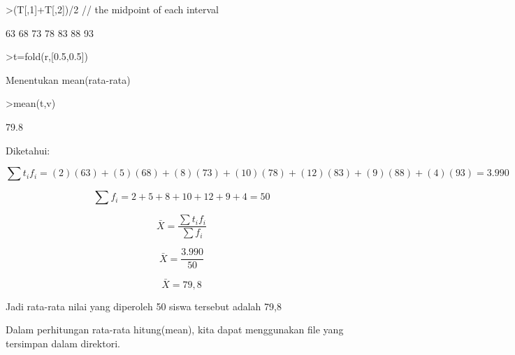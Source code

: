 \documentclass[a4paper,10pt]{article}
\begin{document}
\begin{eulernotebook}
\begin{eulerprompt}
>(T[,1]+T[,2])/2 // the midpoint of each interval
\end{eulerprompt}
\begin{euleroutput}
             63 
             68 
             73 
             78 
             83 
             88 
             93 
\end{euleroutput}
\begin{eulerprompt}
>t=fold(r,[0.5,0.5])
\end{eulerprompt}
\begin{euleroutput}
  [63,  68,  73,  78,  83,  88,  93]
\end{euleroutput}
\begin{eulercomment}
Menentukan mean(rata-rata)
\end{eulercomment}
\begin{eulerprompt}
>mean(t,v)
\end{eulerprompt}
\begin{euleroutput}
  79.8
\end{euleroutput}
\begin{eulercomment}
Diketahui:\\
\end{eulercomment}
\begin{eulerformula}
\[
\sum t_i f_i=(2)(63)+(5)(68)+(8)(73)+(10)(78)+(12)(83)+(9)(88)+(4)(93)=3.990
\]
\end{eulerformula}
\begin{eulerformula}
\[
\sum f_i=2+5+8+10+12+9+4=50
\]
\end{eulerformula}
\begin{eulerformula}
\[
\bar{X} = \frac{\sum t_i f_i}{\sum f_i}
\]
\end{eulerformula}
\begin{eulerformula}
\[
\bar{X} = \frac{3.990}{50}
\]
\end{eulerformula}
\begin{eulerformula}
\[
\bar{X} = 79,8
\]
\end{eulerformula}
\begin{eulercomment}
Jadi rata-rata nilai yang diperoleh 50 siswa tersebut adalah 79,8

\end{eulercomment}
\begin{eulercomment}
Dalam perhitungan rata-rata hitung(mean), kita dapat menggunakan file
yang tersimpan dalam direktori.


\end{eulercomment}
\end{eulernotebook}
\end{document}
